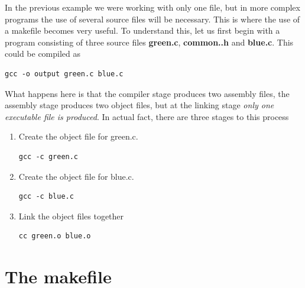 In the previous example we were working with only one file, but in more complex programs the use of several source files will be necessary. This is where the use of a makefile becomes very useful. To understand this, let us first begin with a program consisting of three source files {\bf green.c}, {\bf common..h} and {\bf blue.c}. This could be compiled as 
\begin{verbatim}
gcc -o output green.c blue.c 
\end{verbatim}
What happens here is that the compiler stage produces two assembly files, the assembly stage produces two object files, but at the linking stage \emph{only one executable file is produced}. In actual fact, there are three stages to this process
\begin{enumerate}
\item Create the object file for green.c.
\begin{verbatim}
gcc -c green.c
\end{verbatim}
\item Create the object file for blue.c.
\begin{verbatim}
gcc -c blue.c
\end{verbatim}
\item Link the object files together
\begin{verbatim}
cc green.o blue.o
\end{verbatim}
\end{enumerate}

\section{The makefile}


